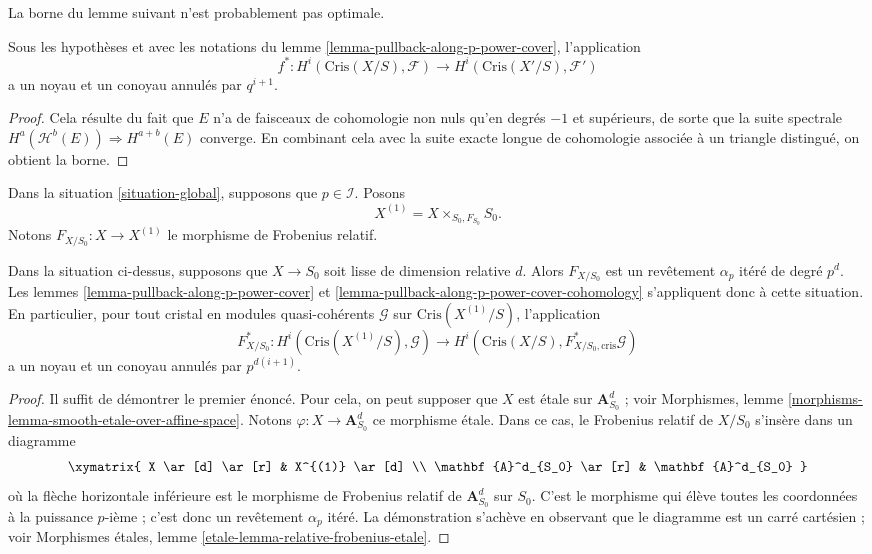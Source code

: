 \noindent
La borne du lemme suivant n'est probablement pas optimale.

\begin{lemma}
\label{lemma-pullback-along-p-power-cover-cohomology}
Sous les hypothèses et avec les notations du
lemme \ref{lemma-pullback-along-p-power-cover},
l'application
$$
f^* :
H^i(\text{Cris}(X/S), \mathcal{F})
\longrightarrow
H^i(\text{Cris}(X'/S), \mathcal{F}')
$$
a un noyau et un conoyau annulés par $q^{i + 1}$.
\end{lemma}

\begin{proof}
Cela résulte du fait que $E$ n'a de faisceaux de cohomologie non nuls qu'en
degrés $-1$ et supérieurs, de sorte que la suite spectrale
$H^a(\mathcal{H}^b(E)) \Rightarrow H^{a + b}(E)$ converge.
En combinant cela avec la suite exacte longue de cohomologie associée
à un triangle distingué, on obtient la borne.
\end{proof}

\noindent
Dans la situation \ref{situation-global}, supposons que $p \in \mathcal{I}$.
Posons
$$
X^{(1)} = X \times_{S_0, F_{S_0}} S_0.
$$
Notons $F_{X/S_0} : X \to X^{(1)}$ le morphisme de Frobenius relatif.

\begin{lemma}
\label{lemma-pullback-relative-frobenius}
Dans la situation ci-dessus, supposons que $X \to S_0$ soit lisse de dimension
relative $d$. Alors $F_{X/S_0}$ est un revêtement $\alpha_p$ itéré
de degré $p^d$. Les lemmes \ref{lemma-pullback-along-p-power-cover} et
\ref{lemma-pullback-along-p-power-cover-cohomology} s'appliquent donc à cette
situation. En particulier, pour tout cristal en modules quasi-cohérents
$\mathcal{G}$ sur $\text{Cris}(X^{(1)}/S)$, l'application
$$
F_{X/S_0}^* : H^i(\text{Cris}(X^{(1)}/S), \mathcal{G})
\longrightarrow
H^i(\text{Cris}(X/S), F_{X/S_0, \text{cris}}^*\mathcal{G})
$$
a un noyau et un conoyau annulés par $p^{d(i + 1)}$.
\end{lemma}

\begin{proof}
Il suffit de démontrer le premier énoncé. Pour cela, on peut supposer
que $X$ est \'etale sur $\mathbf{A}^d_{S_0}$ ; voir
Morphismes, lemme \ref{morphisms-lemma-smooth-etale-over-affine-space}.
Notons $\varphi : X \to \mathbf{A}^d_{S_0}$ ce morphisme \'etale.
Dans ce cas, le Frobenius relatif de $X/S_0$ s'insère dans un diagramme
$$
\xymatrix{
X \ar[d] \ar[r] & X^{(1)} \ar[d] \\
\mathbf{A}^d_{S_0} \ar[r] & \mathbf{A}^d_{S_0}
}
$$
où la flèche horizontale inférieure est le morphisme de Frobenius relatif
de $\mathbf{A}^d_{S_0}$ sur $S_0$. C'est le morphisme qui élève
toutes les coordonnées à la puissance $p$-ième ; c'est donc un revêtement
$\alpha_p$ itéré. La démonstration s'achève en observant que le diagramme
est un carré cartésien ; voir
Morphismes \'etales, lemme \ref{etale-lemma-relative-frobenius-etale}.
\end{proof}













